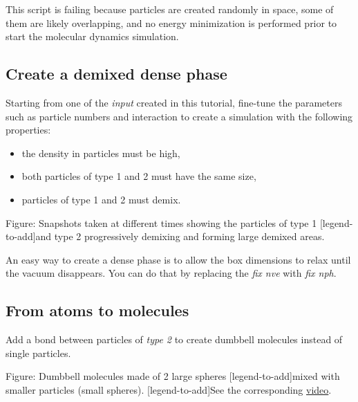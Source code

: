 \begin{tcolorbox}[colback=mylightblue!5!white,colframe=mylightblue!75!black,title=Note]

\vspace{0.25cm} \noindent This script is failing because particles are created
randomly in space, some of them are likely overlapping,
and no energy minimization is performed prior
to start the molecular dynamics simulation.
\end{tcolorbox}

\subsection{Create a demixed dense phase}
Starting from one of the \textit{input} created in this tutorial,
fine-tune the parameters such as particle numbers and interaction
to create a simulation with the following properties:

\begin{itemize}
\item the density in particles must be high,
\item both particles of type 1 and 2 must have the same size,
\item particles of type 1 and 2 must demix. 
\end{itemize}

\vspace{0.25cm} Figure: Snapshots taken at different times showing the particles of type 1 
[legend-to-add]and type 2 progressively demixing and forming large demixed areas.  

\begin{tcolorbox}[colback=mylightblue!5!white,colframe=mylightblue!75!black,title=Hint]

\vspace{0.25cm} \noindent An easy way to create a dense phase is to allow the box dimensions 
to relax until the vacuum disappears. You can do that 
by replacing the \textit{fix nve} with \textit{fix nph}.
\end{tcolorbox}

\subsection{From atoms to molecules}
Add a bond between particles of \textit{type 2} to create
dumbbell molecules instead of single particles.

\vspace{0.25cm} Figure: Dumbbell molecules made of 2 large spheres
[legend-to-add]mixed with smaller particles (small spheres). 
[legend-to-add]See the corresponding \href{https://youtu.be/R_oHonOQi68}{video}.

